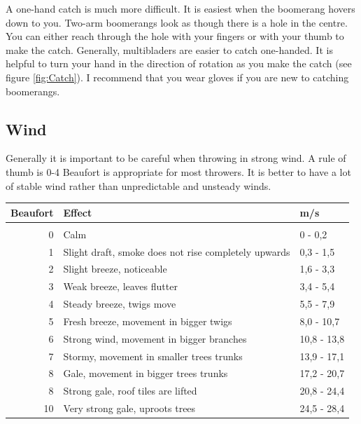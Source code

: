 A one-hand catch is much more difficult. It is easiest when the boomerang hovers down to you. Two-arm boomerangs look as though there is a hole in the centre. You can either reach through the hole with your fingers or with your thumb to make the catch. Generally, multibladers are easier to catch one-handed. It is helpful to turn your hand in the direction of rotation as you make the catch (see figure \ref{fig:Catch}). I recommend that you wear gloves if you are new to catching boomerangs.
\clearpage
\begin{samepage}
\section{Wind}
Generally it is important to be careful when throwing in strong wind. A rule of thumb is 0-4 Beaufort is appropriate for most throwers. It is better to have a lot of stable wind rather than unpredictable and unsteady winds. 
\begin{center}
\colorbox{BOrange!30}{\parbox{30em}{
	\color{black}
	\vspace{1em}
	\centering
\begin{tabulary}{28em}{rLl}
Beaufort & Effect & m/s \\ [0.5ex] %
\hline                  %
\\
\hspace*{-0.5 em}
0 & Calm & 0 - 0,2  \\ %
1 & Slight draft, smoke does not rise completely upwards & 0,3 - 1,5  \\
2 & Slight breeze, noticeable & 1,6 - 3,3  \\
3 & Weak breeze, leaves flutter & 3,4 - 5,4 \\
4 & Steady breeze, twigs move & 5,5 - 7,9 \\
5 & Fresh breeze, movement in bigger twigs & 8,0 - 10,7\\
6 & Strong wind, movement in bigger branches & 10,8 - 13,8\\
7 & Stormy, movement in smaller trees trunks & 13,9 - 17,1\\
8 & Gale, movement in bigger trees trunks & 17,2 - 20,7\\
8 & Strong gale, roof tiles are lifted & 20,8 - 24,4\\
10 & Very strong gale, uproots trees & 24,5 - 28,4\\ [1ex]      %
\end{tabulary}
}}
\end{center}
\end{samepage}
\newpage

